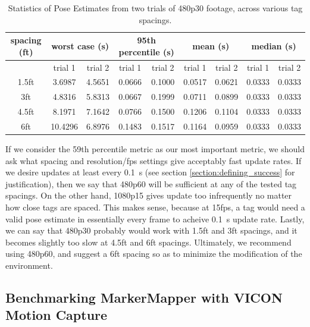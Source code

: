 \documentclass{article}
\begin{document}
    \begin{table}[H]
      \centering
      \begin{tabular}{|c|c|c|c|c|c|c|c|c|} \hline
        spacing (ft) & \multicolumn{2}{c}{worst case (s)} & \multicolumn{2}{c}{95th percentile (s)} & \multicolumn{2}{c}{mean (s)} & \multicolumn{2}{c|}{median (s)} \\ \hline
            & trial 1 & trial 2 & trial 1 & trial 2 & trial 1 & trial 2 & trial 1 & trial 2 \\ \hline
        1.5ft & 3.6987 & 4.5651 & 0.0666 & 0.1000 & 0.0517 & 0.0621 & 0.0333 & 0.0333 \\ \hline
        3ft   & 4.8316 & 5.8313 & 0.0667 & 0.1999 & 0.0711 & 0.0899 & 0.0333 & 0.0333 \\ \hline
        4.5ft & 8.1971 & 7.1642 & 0.0766 & 0.1500 & 0.1206 & 0.1104 & 0.0333 & 0.0333 \\ \hline
        6ft   & 10.4296 & 6.8976 & 0.1483 & 0.1517 & 0.1164 & 0.0959 & 0.0333 & 0.0333 \\ \hline
      \end{tabular}
      \caption{Statistics of Pose Estimates from two trials of 480p30 footage, across various tag spacings.}
      \label{table:480p30_pose_estimate_stats}
    \end{table}

    If we consider the 59th percentile metric as our most important metric, we should ask what spacing and resolution/fps settings give acceptably fast update rates. If we desire updates at least every \SI{0.1}{\second} (see section \ref{section:defining_success} for justification), then we say that 480p60 will be sufficient at any of the tested tag spacings. On the other hand, 1080p15 gives update too infrequently no matter how close tags are spaced. This makes sense, because at 15fps, a tag would need a valid pose estimate in essentially every frame to acheive \SI{0.1}{\second} update rate. Lastly, we can say that 480p30 probably would work with 1.5ft and 3ft spacings, and it becomes slightly too slow at 4.5ft and 6ft spacings. Ultimately, we recommend using 480p60, and suggest a 6ft spacing so as to minimize the modification of the environment.


	\subsection{Benchmarking MarkerMapper with VICON Motion Capture} \label{section:benchmarking_markermapper}
\end{document}

